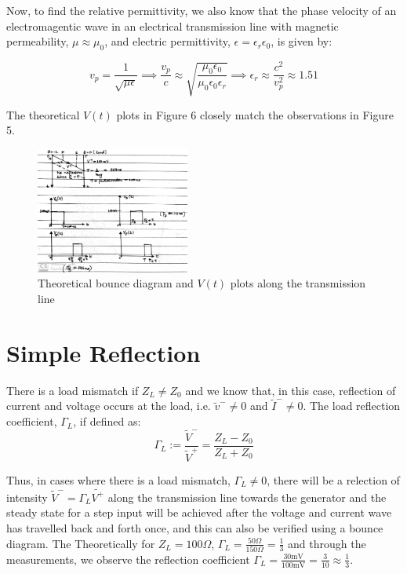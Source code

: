 \documentclass[10pt]{article}
\begin{document}
Now, to find the relative permittivity, we also know that the phase velocity of an electromagentic wave in an electrical transmission line with magnetic permeability, $\mu \approx \mu_0$,
and electric permittivity, $\epsilon = \epsilon_r \epsilon_0$,  is given by: 

\[
    v_p = \frac{1}{\sqrt{\mu \epsilon}} \implies \frac{v_p}{c} \approx 
    \sqrt{\frac{\mu_0\epsilon_0}{\mu_0\epsilon_0\epsilon_r}} \implies 
    \epsilon_r \approx \frac{c^2}{v_p^2} \approx 1.51
\]

The theoretical $V(t)$ plots in Figure 6 closely match the observations in Figure 5.

\begin{figure}[h]
    \centering
    \includegraphics[width=0.45\textwidth]{../photos/lab1/v_t_bounce_no_reflection.jpg}
    \caption{Theoretical bounce diagram and $V(t)$ plots along the transmission line\vspace{-0.5cm}}
    \label{v_t_bounce_no_reflection}
\end{figure}

\section{Simple Reflection}

There is a load mismatch if $Z_L \neq Z_0$ and we know that, in this case, reflection of current and
voltage occurs at the load, i.e. $\tilde v^- \neq 0$ and $\tilde I^- \neq 0$. The load reflection coefficient, $\Gamma_L$,
if defined as:
\[
    \Gamma_L := \frac{\tilde V^-}{\tilde V^+} = \frac{Z_L - Z_0}{Z_L + Z_0}
\]

Thus, in cases where there is a load mismatch, $\Gamma_L \neq 0$, there will be a relection of intensity $\tilde V^- = \Gamma_L\tilde{V^+}$ along the 
transmission line towards the generator and the steady state for a step input will be achieved after the voltage and current 
wave has travelled back and forth once, and this can also be verified using a bounce diagram. The Theoretically for $Z_L = 100\Omega$, $\Gamma_L = \frac{50\Omega}{150\Omega} = \frac{1}{3} $ and through the measurements, we observe the reflection 
coefficient $\Gamma_L = \frac{30\text{mV}}{100\text{mV}} = \frac{3}{10} \approx \frac{1}{3}$.
\end{document}
